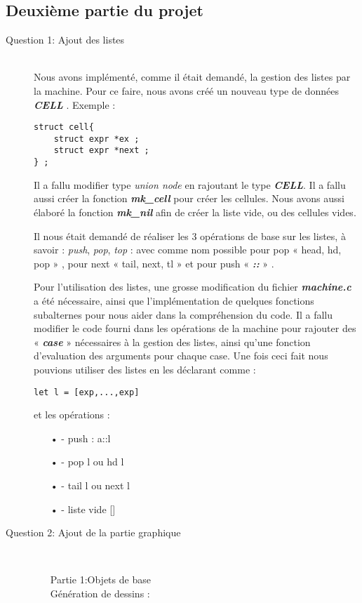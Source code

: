 \documentclass{article}
\begin{document}
\subsection{Deuxième partie du projet}
\begin{description}
\item[Question 1: Ajout des listes]\hfill \\ 
Nous avons implémenté, comme il était demandé, la gestion des listes par la machine.
Pour ce faire, nous avons créé un nouveau type de données \textbf{\emph{CELL}} . Exemple :
\bigskip
\begin{verbatim}
struct cell{
	struct expr *ex ;
	struct expr *next ;
} ;
\end{verbatim}
\bigskip



Il a fallu modifier type \emph{union node} en rajoutant le type \textbf{\emph{CELL}}. Il a fallu aussi créer la fonction \textbf{\emph{mk\_cell}} pour créer les cellules.
\bigskip
Nous avons aussi élaboré la fonction \textbf{\emph{mk\_nil}} afin de créer la liste vide, ou des cellules vides. 

	Il nous était demandé de réaliser les 3 opérations de base sur les listes, à savoir : \emph{push},  \emph{pop}, \emph{top} : avec comme nom possible pour pop « head, hd, pop » , pour next « tail, next, tl » et pour push « \textbf{\emph{::}} » .
	
	Pour l'utilisation des listes, une grosse modification du fichier \textbf{\emph{machine.c}} a été nécessaire, ainsi que l'implémentation de quelques fonctions subalternes pour nous aider dans la compréhension du code. Il a fallu modifier le code fourni dans les opérations de la machine pour rajouter des « \textbf{\emph{case}} » nécessaires à la gestion des listes, ainsi qu'une fonction d'evaluation des arguments pour chaque case.
Une fois ceci fait nous pouvions utiliser des listes en les déclarant comme : 
\bigskip
\begin{verbatim}
let l = [exp,...,exp] 
\end{verbatim}
\bigskip
et les opérations :
\bigskip
\begin{itemize}
	\item[•] - push : a::l
	\item[•] - pop l ou hd l
	\item[•] - tail l ou next l
	\item[•] - liste vide []
\end{itemize}
\bigskip

\item[Question 2: Ajout de la partie graphique]\hfill \\ 
\begin{itemize}
\item[Partie 1:Objets de base]\hfill \\ 
\bigskip
Génération de dessins :


\end{itemize}
\end{description}
\end{document}
